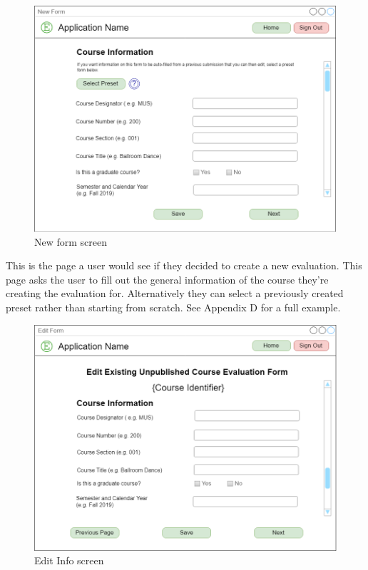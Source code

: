 \documentclass{article}
\begin{document}
\begin{center}
\begin{figure}[H]
    \centering
    \caption{New form screen}
    \includegraphics[scale=.35]{images/create_screen.png}
\end{figure}
\end{center}

This is the page a user would see if they decided to create a new evaluation. This page asks the user to fill out the general information of the course they're creating the evaluation for. Alternatively they can select a previously created preset rather than starting from scratch.  See Appendix D for a full example.

\begin{center}
\begin{figure}[H]
    \centering
    \caption{Edit Info screen}
    \includegraphics[scale=.30]{images/edit_info_screen.png}
\end{figure}
\end{center}
\end{document}
